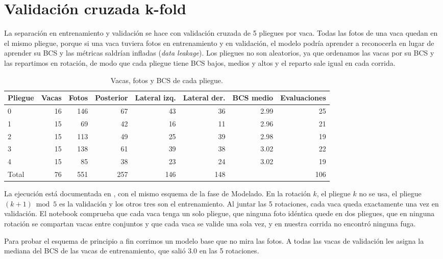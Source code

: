 \documentclass[11pt,letterpaper,DIV=12]{scrartcl}
\begin{document}
\section{Validación cruzada k-fold}

La separación en entrenamiento y validación se hace con validación cruzada de 5 pliegues por vaca. Todas las fotos de una vaca quedan en el mismo pliegue, porque si una vaca tuviera fotos en entrenamiento y en validación, el modelo podría aprender a reconocerla en lugar de aprender su BCS y las métricas saldrían infladas (\textit{data leakage}). Los pliegues no son aleatorios, ya que ordenamos las vacas por su BCS y las repartimos en rotación, de modo que cada pliegue tiene BCS bajos, medios y altos y el reparto sale igual en cada corrida.

\begin{table}[H]
  \centering
  \small
  \caption{Vacas, fotos y BCS de cada pliegue.}
  \label{tab:pliegues}
  \begin{tabular}{lrrrrrrr}
    \toprule
    Pliegue & Vacas & Fotos & Posterior & Lateral izq. & Lateral der. & BCS medio & Evaluaciones \\
    \midrule
    0 & 16 & 146 & 67 & 43 & 36 & 2.99 & 25 \\
    1 & 15 & 69 & 42 & 16 & 11 & 2.96 & 21 \\
    2 & 15 & 113 & 49 & 25 & 39 & 2.98 & 19 \\
    3 & 15 & 138 & 61 & 39 & 38 & 3.02 & 22 \\
    4 & 15 & 85 & 38 & 23 & 24 & 3.02 & 19 \\
    \midrule
    Total & 76 & 551 & 257 & 146 & 148 & & 106 \\
    \bottomrule
  \end{tabular}
\end{table}

La ejecución está documentada en , con el mismo esquema de la fase de Modelado. En la rotación $k$, el pliegue $k$ no se usa, el pliegue $(k + 1) \bmod 5$ es la validación y los otros tres son el entrenamiento. Al juntar las 5 rotaciones, cada vaca queda exactamente una vez en validación. El notebook comprueba que cada vaca tenga un solo pliegue, que ninguna foto idéntica quede en dos pliegues, que en ninguna rotación se compartan vacas entre conjuntos y que cada vaca se valide una sola vez, y en nuestra corrida no encontró ninguna fuga.

Para probar el esquema de principio a fin corrimos un modelo base que no mira las fotos. A todas las vacas de validación les asigna la mediana del BCS de las vacas de entrenamiento, que salió 3.0 en las 5 rotaciones.
\end{document}
